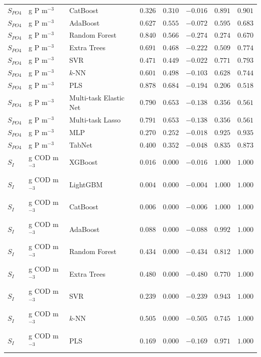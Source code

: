 \begin{longtable}{llp{3.1cm}rrrrr}
$S_{PO4}$ & g P m$^{-3}$ & CatBoost & $0.326$ & $0.310$ & $-0.016$ & $0.891$ & $0.901$ \\
$S_{PO4}$ & g P m$^{-3}$ & AdaBoost & $0.627$ & $0.555$ & $-0.072$ & $0.595$ & $0.683$ \\
$S_{PO4}$ & g P m$^{-3}$ & Random Forest & $0.840$ & $0.566$ & $-0.274$ & $0.274$ & $0.670$ \\
$S_{PO4}$ & g P m$^{-3}$ & Extra Trees & $0.691$ & $0.468$ & $-0.222$ & $0.509$ & $0.774$ \\
$S_{PO4}$ & g P m$^{-3}$ & SVR & $0.471$ & $0.449$ & $-0.022$ & $0.771$ & $0.793$ \\
$S_{PO4}$ & g P m$^{-3}$ & $k$-NN & $0.601$ & $0.498$ & $-0.103$ & $0.628$ & $0.744$ \\
$S_{PO4}$ & g P m$^{-3}$ & PLS & $0.878$ & $0.684$ & $-0.194$ & $0.206$ & $0.518$ \\
$S_{PO4}$ & g P m$^{-3}$ & Multi-task Elastic Net & $0.790$ & $0.653$ & $-0.138$ & $0.356$ & $0.561$ \\
$S_{PO4}$ & g P m$^{-3}$ & Multi-task Lasso & $0.791$ & $0.653$ & $-0.138$ & $0.356$ & $0.561$ \\
$S_{PO4}$ & g P m$^{-3}$ & MLP & $0.270$ & $0.252$ & $-0.018$ & $0.925$ & $0.935$ \\
$S_{PO4}$ & g P m$^{-3}$ & TabNet & $0.400$ & $0.352$ & $-0.048$ & $0.835$ & $0.873$ \\
$S_{I}$ & g COD m$^{-3}$ & XGBoost & $0.016$ & $0.000$ & $-0.016$ & $1.000$ & $1.000$ \\
$S_{I}$ & g COD m$^{-3}$ & LightGBM & $0.004$ & $0.000$ & $-0.004$ & $1.000$ & $1.000$ \\
$S_{I}$ & g COD m$^{-3}$ & CatBoost & $0.006$ & $0.000$ & $-0.006$ & $1.000$ & $1.000$ \\
$S_{I}$ & g COD m$^{-3}$ & AdaBoost & $0.088$ & $0.000$ & $-0.088$ & $0.992$ & $1.000$ \\
$S_{I}$ & g COD m$^{-3}$ & Random Forest & $0.434$ & $0.000$ & $-0.434$ & $0.812$ & $1.000$ \\
$S_{I}$ & g COD m$^{-3}$ & Extra Trees & $0.480$ & $0.000$ & $-0.480$ & $0.770$ & $1.000$ \\
$S_{I}$ & g COD m$^{-3}$ & SVR & $0.239$ & $0.000$ & $-0.239$ & $0.943$ & $1.000$ \\
$S_{I}$ & g COD m$^{-3}$ & $k$-NN & $0.505$ & $0.000$ & $-0.505$ & $0.745$ & $1.000$ \\
$S_{I}$ & g COD m$^{-3}$ & PLS & $0.169$ & $0.000$ & $-0.169$ & $0.971$ & $1.000$ \\

\end{longtable}
